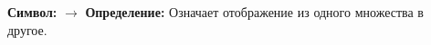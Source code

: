
\hypertarget{axiom-to}{}
\begin{object}[Maps To]
\textbf{Символ:} $\to$
\textbf{Определение:} Означает отображение из одного множества в другое.
\end{object}
